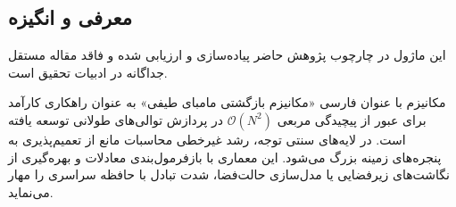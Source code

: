 \subsection{معرفی و انگیزه}
این ماژول در چارچوب پژوهش حاضر پیاده‌سازی و ارزیابی شده و فاقد مقاله مستقل جداگانه در ادبیات تحقیق است.

مکانیزم  با عنوان فارسی «مکانیزم بازگشتی مامبای طیفی» به عنوان راهکاری کارآمد برای عبور از پیچیدگی مربعی $\mathcal{O}(N^2)$ در پردازش توالی‌های طولانی توسعه یافته است. در لایه‌های سنتی توجه، رشد غیرخطی محاسبات مانع از تعمیم‌پذیری به پنجره‌های زمینه بزرگ می‌شود. این معماری با بازفرمول‌بندی معادلات و بهره‌گیری از نگاشت‌های زیرفضایی یا مدل‌سازی حالت‌فضا، شدت تبادل با حافظه سراسری را مهار می‌نماید.
